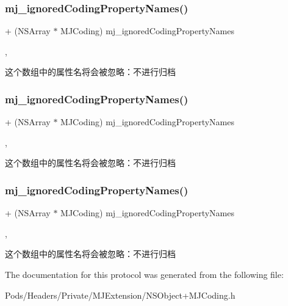 \subsubsection{\texorpdfstring{mj\+\_\+ignored\+Coding\+Property\+Names()}{mj\_ignoredCodingPropertyNames()}\hspace{0.1cm}{\footnotesize\ttfamily [1/3]}}
{\footnotesize\ttfamily + (N\+S\+Array $\ast$ M\+J\+Coding) mj\+\_\+ignored\+Coding\+Property\+Names \begin{DoxyParamCaption}{ }\end{DoxyParamCaption}\hspace{0.3cm}{\ttfamily [static]}, {\ttfamily [optional]}}

这个数组中的属性名将会被忽略：不进行归档 \mbox{\label{protocol_m_j_coding_01-p_add6c186ab2504983dd45153e24f50a7b}} 
\subsubsection{\texorpdfstring{mj\+\_\+ignored\+Coding\+Property\+Names()}{mj\_ignoredCodingPropertyNames()}\hspace{0.1cm}{\footnotesize\ttfamily [2/3]}}
{\footnotesize\ttfamily + (N\+S\+Array $\ast$ M\+J\+Coding) mj\+\_\+ignored\+Coding\+Property\+Names \begin{DoxyParamCaption}{ }\end{DoxyParamCaption}\hspace{0.3cm}{\ttfamily [static]}, {\ttfamily [optional]}}

这个数组中的属性名将会被忽略：不进行归档 \mbox{\label{protocol_m_j_coding_01-p_add6c186ab2504983dd45153e24f50a7b}} 
\subsubsection{\texorpdfstring{mj\+\_\+ignored\+Coding\+Property\+Names()}{mj\_ignoredCodingPropertyNames()}\hspace{0.1cm}{\footnotesize\ttfamily [3/3]}}
{\footnotesize\ttfamily + (N\+S\+Array $\ast$ M\+J\+Coding) mj\+\_\+ignored\+Coding\+Property\+Names \begin{DoxyParamCaption}{ }\end{DoxyParamCaption}\hspace{0.3cm}{\ttfamily [static]}, {\ttfamily [optional]}}

这个数组中的属性名将会被忽略：不进行归档 

The documentation for this protocol was generated from the following file\+:\begin{DoxyCompactItemize}
\item 
Pods/\+Headers/\+Private/\+M\+J\+Extension/N\+S\+Object+\+M\+J\+Coding.\+h\end{DoxyCompactItemize}
